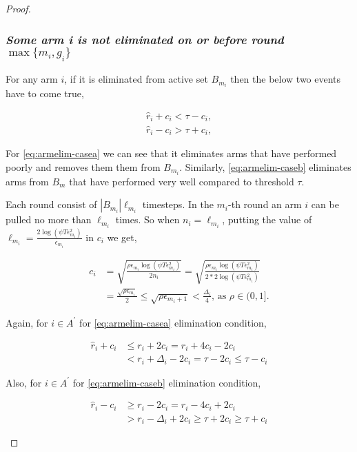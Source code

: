 \begin{proof}
\subsubsection{\textit{Some arm i is not eliminated on or before round $\max\lbrace m_{i},g_{i}\rbrace$}}
For any arm $i$, if it is eliminated from active set $B_{m_{i}}$ then the below two events have to come true,
\begin{small}
\begin{align}
\hat{r}_{i} + c_{i} < \tau - c_{i}, \label{eq:armelim-casea}\\
\hat{r}_{i} - c_{i} > \tau + c_{i}, \label{eq:armelim-caseb}
\end{align}
\end{small}


For \ref{eq:armelim-casea} we can see that it eliminates arms that have performed poorly and removes them them from $B_{m_{i}}$. Similarly, \ref{eq:armelim-caseb} eliminates arms from $B_{m}$ that have performed very well compared to threshold $\tau$.

Each round consist of $|B_{m_{i}}|\ell_{m_{i}}$ timesteps. In the $m_{i}$-th round an arm $i$ can be pulled no more than $\ell_{m_{i}}$ times. So when $n_{i}=\ell_{m_{i}}$, putting the value of $\ell_{m_{i}}=\frac{2\log{(\psi T\epsilon_{m_{i}}^{2})}}{\epsilon_{m_{i}}}$ in $c_{i}$ we get, 
\begin{small}
\begin{align*}
c_{i}&=\sqrt{\frac{\rho\epsilon_{m_{i}}\log (\psi T\epsilon_{m_{i}}^{2})}{2 n_{i}}}
=\sqrt{\frac{\rho\epsilon_{m_{i}}\log (\psi T\epsilon_{m_{i}}^{2})}{2*2 \log(\psi T\epsilon_{m_{i}}^{2})}}\\
& =\frac{\sqrt{\rho\epsilon_{m_{i}}}}{2}
 \leq \sqrt{\rho\epsilon_{m_{i}+1}} < \frac{\Delta_{i}}{4} \text{, as }\rho\in (0,1].
\end{align*}
\end{small}


Again, for ${i} \in A^{'}$ for \ref{eq:armelim-casea} elimination condition, 
\begin{small}
\begin{align*}
\hat{r}_{i} + c_{i}&\leq r_{i} + 2c_{i} = r_{i} + 4c_{i} - 2c_{i} \\
&< r_{i} + \Delta_{i} - 2c_{i} = \tau -2c_{i} \leq \tau - c_{i}
\end{align*}
\end{small}


Also, for ${i} \in A^{'}$ for \ref{eq:armelim-caseb} elimination condition, 
\begin{small}
\begin{align*}
\hat{r}_{i} - c_{i}&\geq r_{i} - 2c_{i} = r_{i} - 4c_{i} + 2c_{i} \\
&> r_{i} - \Delta_{i} + 2c_{i}\geq \tau + 2c_{i} \geq \tau + c_{i}
\end{align*}
\end{small}



\end{proof}
